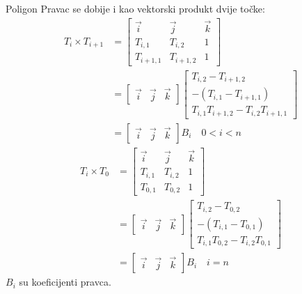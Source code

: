 \documentclass[9pt]{beamer}
\begin{document}
\begin{frame}{Poligon}
	Pravac se dobije i kao vektorski produkt dvije točke:
	\begin{align*}
	T_i \times T_{i+1} & = \begin{bmatrix}
	\vec{i} & \vec{j}  & \vec{k}\\ 
	T_{i, 1} & T_{i, 2} & 1 \\
	T_{i+1, 1} & T_{i+1, 2} & 1 \end{bmatrix} \\
	& = \begin{bmatrix}
	\vec{i} & \vec{j}  & \vec{k}
	\end{bmatrix} 
	\begin{bmatrix}
	T_{i, 2} - T_{i+1, 2}\\
	-(T_{i, 1} - T_{i+1, 1})\\
	T_{i,1}T_{i+1, 2}- T_{i,2}T_{i+1, 1} 
	\end{bmatrix} \\
	& = \begin{bmatrix}
	\vec{i} & \vec{j}  & \vec{k}
	\end{bmatrix}B_i \quad 0 < i < n
	\end{align*}
	\begin{align*}
	T_i \times T_0 & = \begin{bmatrix}
	\vec{i} & \vec{j}  & \vec{k}\\ 
	T_{i, 1} & T_{i, 2} & 1 \\
	T_{0, 1} & T_{0, 2} & 1 \end{bmatrix} \\
	& = \begin{bmatrix}
	\vec{i} & \vec{j}  & \vec{k}
	\end{bmatrix} 
	\begin{bmatrix}
	T_{i, 2} - T_{0, 2}\\
	-(T_{i, 1} - T_{0, 1})\\
	T_{i,1}T_{0, 2}- T_{i,2}T_{0, 1} 
	\end{bmatrix} \\
	& = \begin{bmatrix}
	\vec{i} & \vec{j}  & \vec{k}
	\end{bmatrix}B_i \quad i = n
	\end{align*}
	$B_i$ su koeficijenti pravca.
\end{frame}
\end{document}
